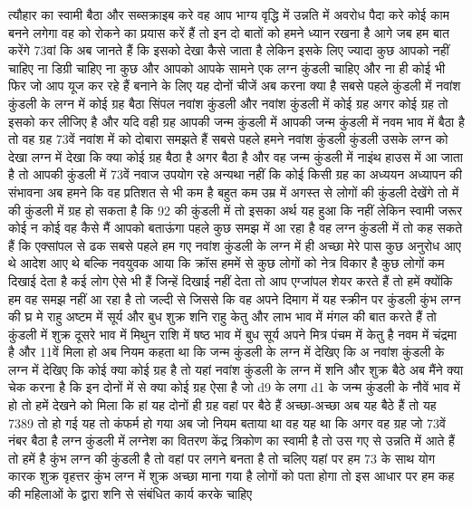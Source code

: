 त्यौहार का स्वामी बैठा और सब्सक्राइब करे
वह आप भाग्य वृद्धि में उन्नति में अवरोध पैदा करे कोई काम बनने लगेगा वह को रोकने
का प्रयास करें हैं तो इन दो बातों को हमने ध्यान रखना है आगे जब हम बात करेंगे 73वां कि अब जानते
हैं कि इसको देखा कैसे जाता है लेकिन इसके लिए ज्यादा कुछ आपको नहीं चाहिए ना डिग्री
चाहिए ना कुछ और आपको आपके सामने एक लग्न कुंडली चाहिए और ना ही कोई भी फिर जो आप
यूज कर रहे हैं बनाने के लिए यह दोनों चीजें अब करना क्या है सबसे पहले कुंडली
में नवांश कुंडली के लग्न में कोई ग्रह बैठा सिंपल नवांश कुंडली और नवांश कुंडली
में कोई ग्रह अगर कोई ग्रह तो इसको कर लीजिए
है और यदि वही ग्रह आपकी जन्म कुंडली में आपकी जन्म कुंडली में नवम भाव में बैठा है
तो वह ग्रह 73वें नवांश में को दोबारा समझते हैं सबसे पहले हमने नवांश कुंडली कुंडली उसके लग्न को देखा लग्न में
देखा कि क्या कोई ग्रह बैठा है अगर बैठा है और वह जन्म कुंडली में नाइंथ हाउस में आ जाता है तो आपकी कुंडली में 73वें नवाज
उपयोग रहे अन्यथा नहीं कि कोई किसी ग्रह का अध्ययन अध्यापन की संभावना अब हमने कि
वह प्रतिशत से भी कम है बहुत कम उम्र में अगस्त से लोगों की कुंडली देखेंगे तो में की कुंडली में ग्रह हो सकता है कि 92 की
कुंडली में तो इसका अर्थ यह हुआ कि नहीं लेकिन स्वामी जरूर कोई न कोई वह कैसे मैं
आपको बताऊंगा पहले कुछ समझ में आ रहा है
वह लग्न कुंडली में तो कह सकते हैं कि
एक्सांपल से ढक सबसे पहले हम गए नवांश कुंडली के लग्न
में ही अच्छा मेरे पास कुछ अनुरोध आए थे आदेश आए थे बल्कि नवयुवक आया कि क्रॉस
हममें से कुछ लोगों को नेत्र विकार है कुछ लोगों कम दिखाई देता है कई लोग ऐसे भी हैं जिन्हें दिखाई नहीं देता तो आप एग्जांपल
शेयर करते हैं तो हमें क्योंकि हम वह समझ
नहीं आ रहा है तो जल्दी से जिससे कि वह
अपने दिमाग में यह स्क्रीन पर कुंडली कुंभ
लग्न की घ्र मे राहु अष्टम में सूर्य और बुध शुक्र शनि राहु केतु और लाभ भाव में
मंगल की बात करते हैं तो कुंडली में शुक्र दूसरे भाव में मिथुन राशि में षष्ठ भाव
में बुध सूर्य अपने मित्र पंचम में केतु है नवम में चंद्रमा है और 11वें मिला हो अब नियम कहता
था कि जन्म कुंडली के लग्न में देखिए कि अ नवांश कुंडली के लग्न में देखिए कि कोई क्या कोई ग्रह है तो यहां नवांश कुंडली के
लग्न में शनि और शुक्र बैठे अब मैंने क्या चेक करना है कि इन दोनों में से क्या कोई ग्रह ऐसा है जो d9 के लगा d1 के जन्म
कुंडली के नौवें भाव में हो तो हमें देखने को मिला कि हां यह दोनों ही ग्रह वहां पर बैठे हैं
अच्छा-अच्छा अब यह बैठे हैं तो यह 7389 तो हो गई यह तो कंफर्म हो गया अब जो नियम बताया था वह यह था कि अगर वह ग्रह जो
73वें नंबर बैठा है लग्न कुंडली में लग्नेश का वितरण केंद्र त्रिकोण का स्वामी
है तो उस गए से उन्नति में आते हैं तो हमें है कुंभ लग्न की कुंडली है तो वहां
पर लगने बनता है तो चलिए यहां पर हम 73 के
साथ योग कारक शुक्र वृहत्तर कुंभ लग्न में शुक्र अच्छा माना गया है लोगों को पता
होगा तो इस आधार पर हम कह की महिलाओं के द्वारा शनि से संबंधित कार्य करके चाहिए
